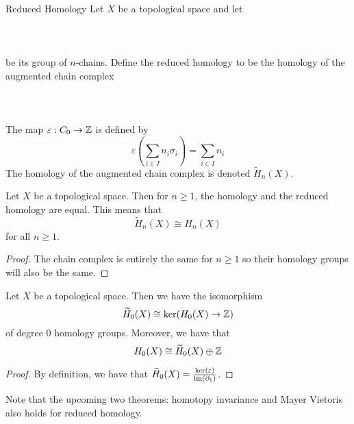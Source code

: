 \documentclass[a4paper]{article}
\begin{document}
\begin{defn}{Reduced Homology}{} Let $X$ be a topological space and let \\~\\ \\~\\
be its group of $n$-chains. Define the reduced homology to be the homology of the augmented chain complex \\~\\
\\~\\
The map $\varepsilon:C_0\to\mathbb{Z}$ is defined by $$\varepsilon\left(\sum_{i\in I}n_i\sigma_i\right)=\sum_{i\in I}n_i$$ The homology of the augmented chain complex is denoted $\widetilde{H}_n(X)$. 
\end{defn}

\begin{lmm}{}{} Let $X$ be a topological space. Then for $n\geq 1$, the homology and the reduced homology are equal. This means that $$\widetilde{H}_n(X)\cong H_n(X)$$ for all $n\geq 1$. \tcbline
\begin{proof}
The chain complex is entirely the same for $n\geq 1$ so their homology groups will also be the same. 
\end{proof}
\end{lmm}

\begin{prp}{}{} Let $X$ be a topological space. Then we have the isomorphism $$\widetilde{H}_0(X)\cong\ker(H_0(X)\to\mathbb{Z})$$ of degree $0$ homology groups. Moreover, we have that $$H_0(X)\cong\widetilde{H}_0(X)\oplus\mathbb{Z}$$ \tcbline
\begin{proof}
By definition, we have that $\widetilde{H}_0(X)=\frac{\ker(\varepsilon)}{\operatorname{im}(\partial_1)}$. 
\end{proof}
\end{prp}

Note that the upcoming two theorems: homotopy invariance and Mayer Vietoris also holds for reduced homology. 
\end{document}
